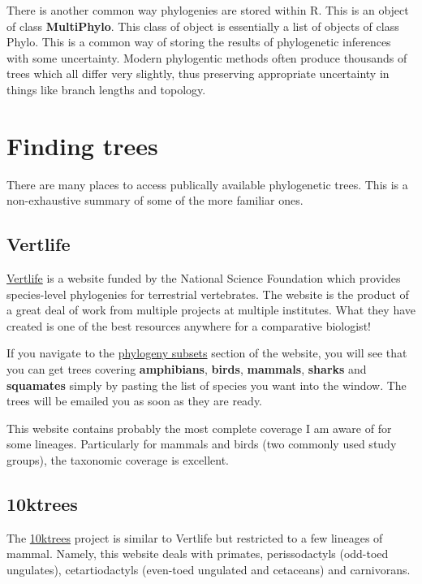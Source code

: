 \documentclass[
]{book}
\begin{document}
There is another common way phylogenies are stored within R. This is an object of class \textbf{MultiPhylo}. This class of object is essentially a list of objects of class Phylo. This is a common way of storing the results of phylogenetic inferences with some uncertainty. Modern phylogentic methods often produce thousands of trees which all differ very slightly, thus preserving appropriate uncertainty in things like branch lengths and topology.

\hypertarget{finding-trees}{%
\section{Finding trees}\label{finding-trees}}

There are many places to access publically available phylogenetic trees. This is a non-exhaustive summary of some of the more familiar ones.

\hypertarget{vertlife}{%
\subsection{Vertlife}\label{vertlife}}

\href{https://vertlife.org/}{Vertlife} is a website funded by the National Science Foundation which provides species-level phylogenies for terrestrial vertebrates. The website is the product of a great deal of work from multiple projects at multiple institutes. What they have created is one of the best resources anywhere for a comparative biologist!

If you navigate to the \href{https://vertlife.org/phylosubsets/}{phylogeny subsets} section of the website, you will see that you can get trees covering \textbf{amphibians}, \textbf{birds}, \textbf{mammals}, \textbf{sharks} and \textbf{squamates} simply by pasting the list of species you want into the window. The trees will be emailed you as soon as they are ready.

This website contains probably the most complete coverage I am aware of for some lineages. Particularly for mammals and birds (two commonly used study groups), the taxonomic coverage is excellent.

\hypertarget{ktrees}{%
\subsection{10ktrees}\label{ktrees}}

The \href{https://10ktrees.nunn-lab.org/}{10ktrees} project is similar to Vertlife but restricted to a few lineages of mammal. Namely, this website deals with primates, perissodactyls (odd-toed ungulates), cetartiodactyls (even-toed ungulated and cetaceans) and carnivorans.
\end{document}
